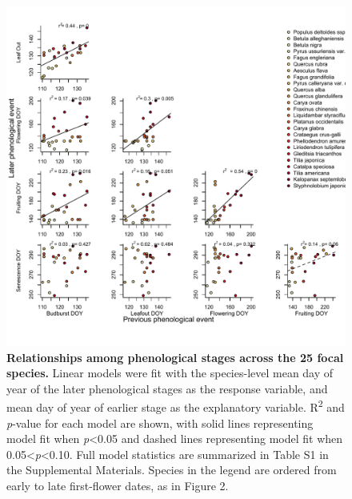 \documentclass{article}
\begin{document}
  \begin{figure}[h]
  \centering
  \includegraphics{../analyses/figures/latevearly_rp_col_legend_YOR.pdf}
  
  \caption{\textbf{Relationships among phenological stages across the 25 focal species.} Linear models were fit with the species-level mean day of year of the later phenological stages as the response variable, and mean day of year of earlier stage as the explanatory variable. R\textsuperscript{2} and \textit{p}-value for each model are shown, with solid lines representing model fit when \textit{p}<0.05 and dashed lines representing model fit when 0.05<\textit{p}<0.10. Full model statistics are summarized in Table S1 in the Supplemental Materials. Species in the legend are ordered from early to late first-flower dates, as in Figure 2.}
  \label{fig:latevearly}
\end{figure}
\end{document}
